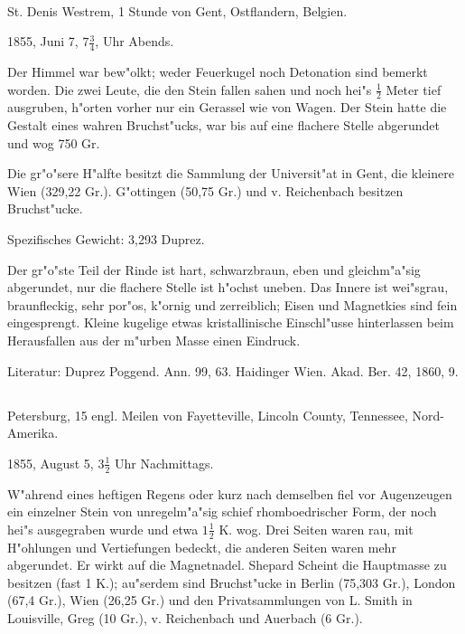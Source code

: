 \documentclass[a4paper, 11pt, oneside]{article}
\begin{document}
\paragraph{}
St. Denis Westrem, 1 Stunde von Gent, Ostflandern, Belgien.

1855, Juni 7, $\mathfrak{7\frac{3}{4}}$, Uhr Abends.

Der Himmel war bew"olkt; weder Feuerkugel noch Detonation sind bemerkt worden. Die zwei Leute, die den Stein fallen sahen und noch hei"s $\mathfrak{\frac{1}{2}}$ Meter tief ausgruben, h"orten vorher nur ein Gerassel wie von Wagen. Der Stein hatte die Gestalt eines wahren Bruchst"ucks, war bis auf eine flachere Stelle abgerundet und wog 750 Gr.

Die gr"o"sere H"alfte besitzt die Sammlung der Universit"at in Gent, die kleinere Wien (329,22 Gr.). G"ottingen (50,75 Gr.) und v. Reichenbach besitzen Bruchst"ucke.

Spezifisches Gewicht: 3,293 Duprez.

Der gr"o"ste Teil der Rinde ist hart, schwarzbraun, eben und gleichm"a"sig abgerundet, nur die flachere Stelle ist h"ochst uneben. Das Innere ist wei"sgrau, braunfleckig, sehr por"os, k"ornig und zerreiblich; Eisen und Magnetkies sind fein eingesprengt. Kleine kugelige etwas kristallinische Einschl"usse hinterlassen beim Herausfallen aus der m"urben Masse einen Eindruck.

\normalsize
Literatur: Duprez Poggend. Ann. 99, 63. Haidinger Wien. Akad. Ber. 42, 1860, 9.

\subsection{}
\LARGE
\paragraph{}
Petersburg, 15 engl. Meilen von Fayetteville, Lincoln County, Tennessee, Nord-Amerika.

1855, August 5, $\mathfrak{3\frac{1}{2}}$ Uhr Nachmittags.

W"ahrend eines heftigen Regens oder kurz nach demselben fiel vor Augenzeugen ein einzelner Stein von unregelm"a"sig schief rhomboedrischer Form, der noch hei"s ausgegraben wurde und etwa $\mathfrak{1\frac{1}{2}}$ K. wog. Drei Seiten waren rau, mit H"ohlungen und Vertiefungen bedeckt, die anderen Seiten waren mehr abgerundet. Er wirkt auf die Magnetnadel. Shepard Scheint die Hauptmasse zu besitzen (fast 1 K.); au"serdem sind Bruchst"ucke in Berlin (75,303 Gr.), London (67,4 Gr.), Wien (26,25 Gr.) und den Privatsammlungen von L. Smith in Louisville, Greg (10 Gr.), v. Reichenbach und Auerbach (6 Gr.).
\end{document}
